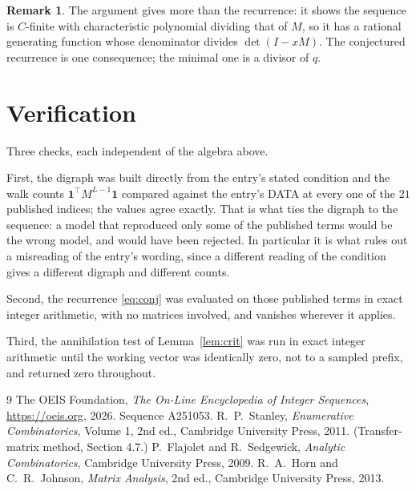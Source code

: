 \documentclass[11pt,a4paper]{article}
\theoremstyle{plain}
\theoremstyle{definition}
\newtheorem{remark}[theorem]{Remark}
\begin{document}
\begin{remark}
The argument gives more than the recurrence: it shows the sequence is $C$-finite with
characteristic polynomial dividing that of $M$, so it has a rational generating function
whose denominator divides $\det(I-xM)$. The conjectured recurrence is one consequence; the
minimal one is a divisor of $q$.
\end{remark}

\section{Verification}

Three checks, each independent of the algebra above.

First, the digraph was built directly from the entry's stated condition and the walk counts
$\mathbf{1}^{\!\top}M^{L-1}\mathbf{1}$ compared against the entry's DATA at
every one of the $21$ published indices; the values agree exactly. That is what ties
the digraph to the sequence: a model that reproduced only some of the published terms would
be the wrong model, and would have been rejected. In particular it is what rules out a
misreading of the entry's wording, since a different reading of the condition gives a
different digraph and different counts.

Second, the recurrence \eqref{eq:conj} was evaluated on those published terms in exact
integer arithmetic, with no matrices involved, and vanishes wherever it applies.

Third, the annihilation test of Lemma~\ref{lem:crit} was run in exact integer arithmetic
until the working vector was identically zero, not to a sampled prefix, and returned zero
throughout.

\begin{thebibliography}{9}
 The OEIS Foundation, \emph{The On-Line Encyclopedia of Integer
Sequences}, \url{https://oeis.org}, 2026. Sequence A251053.
 R.~P.~Stanley, \emph{Enumerative Combinatorics}, Volume 1, 2nd ed.,
Cambridge University Press, 2011. (Transfer-matrix method, Section 4.7.)
 P.~Flajolet and R.~Sedgewick, \emph{Analytic Combinatorics}, Cambridge
University Press, 2009.
 R.~A.~Horn and C.~R.~Johnson, \emph{Matrix Analysis}, 2nd ed., Cambridge
University Press, 2013.
\end{thebibliography}
\end{document}
